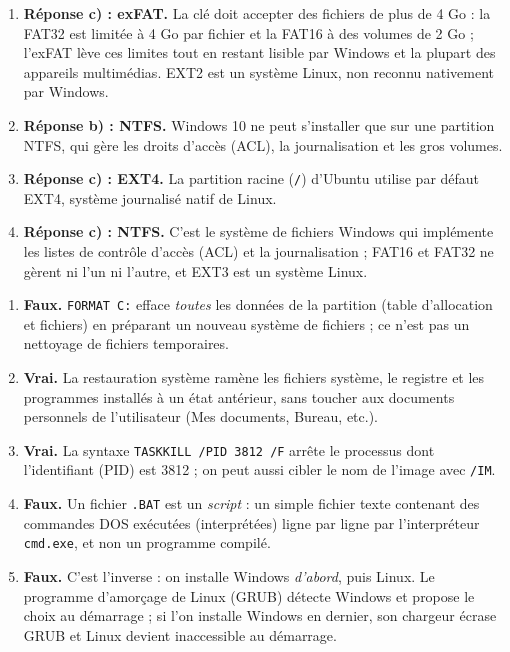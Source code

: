 \documentclass[11pt]{article}
\begin{document}
\begin{corrige}
\begin{enumerate}
  \item \textbf{Réponse c) : exFAT.} La clé doit accepter des fichiers de plus de 4 Go : la FAT32 est limitée à 4 Go par fichier et la FAT16 à des volumes de 2 Go ; l'exFAT lève ces limites tout en restant lisible par Windows et la plupart des appareils multimédias. EXT2 est un système Linux, non reconnu nativement par Windows.
  \item \textbf{Réponse b) : NTFS.} Windows 10 ne peut s'installer que sur une partition NTFS, qui gère les droits d'accès (ACL), la journalisation et les gros volumes.
  \item \textbf{Réponse c) : EXT4.} La partition racine (\texttt{/}) d'Ubuntu utilise par défaut EXT4, système journalisé natif de Linux.
  \item \textbf{Réponse c) : NTFS.} C'est le système de fichiers Windows qui implémente les listes de contrôle d'accès (ACL) et la journalisation ; FAT16 et FAT32 ne gèrent ni l'un ni l'autre, et EXT3 est un système Linux.
\end{enumerate}
\end{corrige}

\begin{corrige}
\begin{enumerate}
  \item \textbf{Faux.} \texttt{FORMAT C:} efface \emph{toutes} les données de la partition (table d'allocation et fichiers) en préparant un nouveau système de fichiers ; ce n'est pas un nettoyage de fichiers temporaires.
  \item \textbf{Vrai.} La restauration système ramène les fichiers système, le registre et les programmes installés à un état antérieur, sans toucher aux documents personnels de l'utilisateur (Mes documents, Bureau, etc.).
  \item \textbf{Vrai.} La syntaxe \texttt{TASKKILL /PID 3812 /F} arrête le processus dont l'identifiant (PID) est 3812 ; on peut aussi cibler le nom de l'image avec \texttt{/IM}.
  \item \textbf{Faux.} Un fichier \texttt{.BAT} est un \emph{script} : un simple fichier texte contenant des commandes DOS exécutées (interprétées) ligne par ligne par l'interpréteur \texttt{cmd.exe}, et non un programme compilé.
  \item \textbf{Faux.} C'est l'inverse : on installe Windows \emph{d'abord}, puis Linux. Le programme d'amorçage de Linux (GRUB) détecte Windows et propose le choix au démarrage ; si l'on installe Windows en dernier, son chargeur écrase GRUB et Linux devient inaccessible au démarrage.
\end{enumerate}
\end{corrige}
\end{document}

